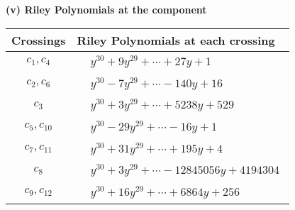 \documentclass[1p]{elsarticle_modified}
\theoremstyle{definition}
\begin{document}
\flushleft \textbf{(v) Riley Polynomials at the component}\newline \\
\begin{tabular}{m{50pt}|m{274pt}}
Crossings & \hspace{64pt}Riley Polynomials at each crossing \\
\hline $$\begin{aligned}c_{1},c_{4}\end{aligned}$$&$\begin{aligned}
&y^{30}+9 y^{29}+\cdots+27 y+1
\end{aligned}$\\
\hline $$\begin{aligned}c_{2},c_{6}\end{aligned}$$&$\begin{aligned}
&y^{30}-7 y^{29}+\cdots-140 y+16
\end{aligned}$\\
\hline $$\begin{aligned}c_{3}\end{aligned}$$&$\begin{aligned}
&y^{30}+3 y^{29}+\cdots+5238 y+529
\end{aligned}$\\
\hline $$\begin{aligned}c_{5},c_{10}\end{aligned}$$&$\begin{aligned}
&y^{30}-29 y^{29}+\cdots-16 y+1
\end{aligned}$\\
\hline $$\begin{aligned}c_{7},c_{11}\end{aligned}$$&$\begin{aligned}
&y^{30}+31 y^{29}+\cdots+195 y+4
\end{aligned}$\\
\hline $$\begin{aligned}c_{8}\end{aligned}$$&$\begin{aligned}
&y^{30}+3 y^{29}+\cdots-12845056 y+4194304
\end{aligned}$\\
\hline $$\begin{aligned}c_{9},c_{12}\end{aligned}$$&$\begin{aligned}
&y^{30}+16 y^{29}+\cdots+6864 y+256
\end{aligned}$\\
\hline
\end{tabular}\\~\\
\end{document}
